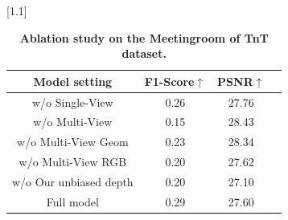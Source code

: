 \begin{table}%
  \caption{\textbf{Ablation study on the Meetingroom of TnT dataset.}}
  \label{tab:ablation}
  \scriptsize%
  \centering%
  \setlength{\tabcolsep}{5pt}
  \scalebox{1.1}[1.1]{
  \begin{tabu}{c|ccc}
  \toprule
     Model setting & F1-Score$\uparrow$ & PSNR$\uparrow$ \\
  \midrule
  w/o Single-View & 0.26 & 27.76  \\
  w/o Multi-View & 0.15 & 28.43  \\
  w/o Multi-View Geom & 0.23 & 28.34  \\
  w/o Multi-View RGB & 0.20 & 27.62  \\
  w/o Our unbiased depth & 0.20 & 27.10  \\
  \midrule
  Full model & 0.29 & 27.60 \\
  \bottomrule
  \end{tabu}
  }
  \vspace{-0.3cm}
\end{table}
